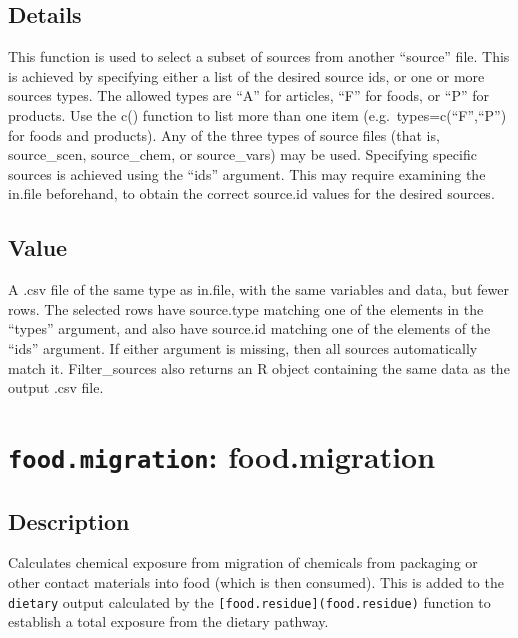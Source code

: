 \documentclass[
]{article}
\begin{document}
\hypertarget{details-14}{%
\subsection{Details}\label{details-14}}

This function is used to select a subset of sources from another
``source'' file. This is achieved by specifying either a list of the
desired source ids, or one or more sources types. The allowed types are
``A'' for articles, ``F'' for foods, or ``P'' for products. Use the c()
function to list more than one item (e.g.~types=c(``F'',``P'') for foods
and products). Any of the three types of source files (that is,
source\_scen, source\_chem, or source\_vars) may be used. Specifying
specific sources is achieved using the ``ids'' argument. This may
require examining the in.file beforehand, to obtain the correct
source.id values for the desired sources.

\hypertarget{value-16}{%
\subsection{Value}\label{value-16}}

A .csv file of the same type as in.file, with the same variables and
data, but fewer rows. The selected rows have source.type matching one of
the elements in the ``types'' argument, and also have source.id matching
one of the elements of the ``ids'' argument. If either argument is
missing, then all sources automatically match it. Filter\_sources also
returns an R object containing the same data as the output .csv file.

\hypertarget{food.migration-food.migration}{%
\section{\texorpdfstring{\texttt{food.migration}:
food.migration}{food.migration: food.migration}}\label{food.migration-food.migration}}

\hypertarget{description-22}{%
\subsection{Description}\label{description-22}}

Calculates chemical exposure from migration of chemicals from packaging
or other contact materials into food (which is then consumed). This is
added to the \texttt{dietary} output calculated by the
\texttt{{[}food.residue{]}(food.residue)} function to establish a total
exposure from the dietary pathway.
\end{document}
